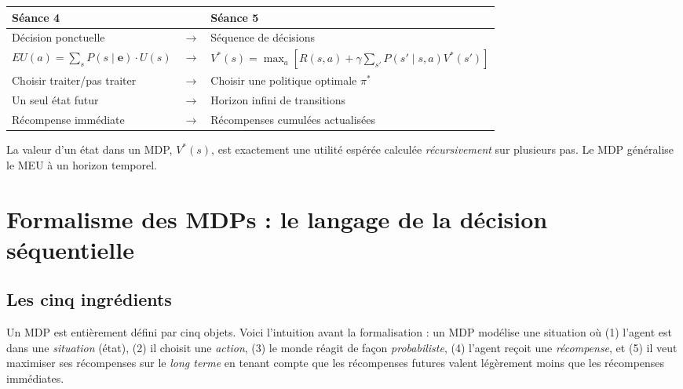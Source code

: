 \documentclass[11pt,a4paper]{article}
\begin{document}
\begin{pontbox}
\begin{center}
\renewcommand{\arraystretch}{1.6}
\begin{tabular}{lcl}
\textbf{Séance 4} & & \textbf{Séance 5} \\
\hline
Décision ponctuelle & $\longrightarrow$ & Séquence de décisions \\
$EU(a) = \sum_s P(s \mid \mathbf{e}) \cdot U(s)$ & $\longrightarrow$ & $V^*(s) = \max_a \!\left[R(s,a) + \gamma \sum_{s'} P(s' \mid s,a) V^*(s')\right]$ \\
Choisir traiter/pas traiter & $\longrightarrow$ & Choisir une politique optimale $\pi^*$ \\
Un seul état futur & $\longrightarrow$ & Horizon infini de transitions \\
Récompense immédiate & $\longrightarrow$ & Récompenses cumulées actualisées \\
\end{tabular}
\end{center}
La valeur d'un état dans un MDP, $V^*(s)$, est exactement une utilité espérée calculée \textit{récursivement} sur plusieurs pas. Le MDP généralise le MEU à un horizon temporel.
\end{pontbox}

\section{Formalisme des MDPs : le langage de la décision séquentielle}

\subsection{Les cinq ingrédients}

Un MDP est entièrement défini par cinq objets. Voici l'intuition avant la formalisation : un MDP modélise une situation où (1) l'agent est dans une \textit{situation} (état), (2) il choisit une \textit{action}, (3) le monde réagit de façon \textit{probabiliste}, (4) l'agent reçoit une \textit{récompense}, et (5) il veut maximiser ses récompenses sur le \textit{long terme} en tenant compte que les récompenses futures valent légèrement moins que les récompenses immédiates.
\end{document}
